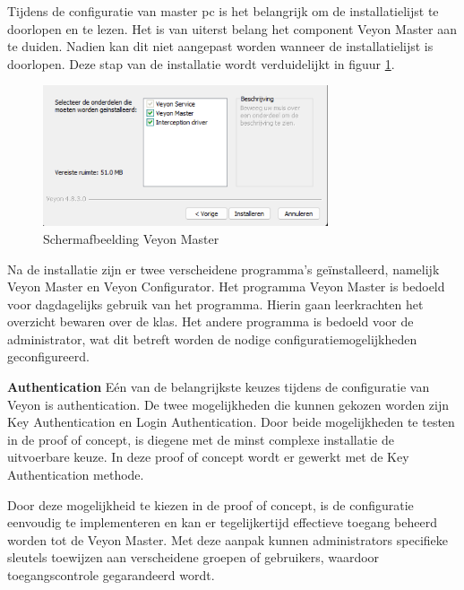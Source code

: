 Tijdens de configuratie van master pc is het belangrijk om de installatielijst te doorlopen en te lezen. Het is van uiterst belang het component Veyon Master aan te duiden. Nadien kan dit niet aangepast worden wanneer de installatielijst is doorlopen. Deze stap van de installatie wordt verduidelijkt in figuur \ref{fig:Schermafbeelding Veyon Master}.

\begin{figure}[h]
    \centering
    \includegraphics[width=0.75\textwidth]{graphics/SchermafbeeldingVeyonMaster.png}
    \caption{Schermafbeelding Veyon Master}
    \label{fig:Schermafbeelding Veyon Master} 
\end{figure}

Na de installatie zijn er twee verscheidene programma's geïnstalleerd, namelijk Veyon Master en Veyon Configurator. Het programma Veyon Master is bedoeld voor dagdagelijks gebruik van het programma. Hierin gaan leerkrachten het overzicht bewaren over de klas. Het andere programma is bedoeld voor de administrator, wat dit betreft worden de nodige configuratiemogelijkheden geconfigureerd. \newline

\textbf{Authentication}\newline
Eén van de belangrijkste keuzes tijdens de configuratie van Veyon is authentication. De twee mogelijkheden die kunnen gekozen worden zijn Key Authentication en Login Authentication. Door beide mogelijkheden te testen in de proof of concept, is diegene met de minst complexe installatie de uitvoerbare keuze. In deze proof of concept wordt er gewerkt met de Key Authentication methode. \newline

Door deze mogelijkheid te kiezen in de proof of concept, is de configuratie eenvoudig te implementeren en kan er tegelijkertijd effectieve toegang beheerd worden tot de Veyon Master. Met deze aanpak kunnen administrators specifieke sleutels toewijzen aan verscheidene groepen of gebruikers, waardoor toegangscontrole gegarandeerd wordt. \newline

